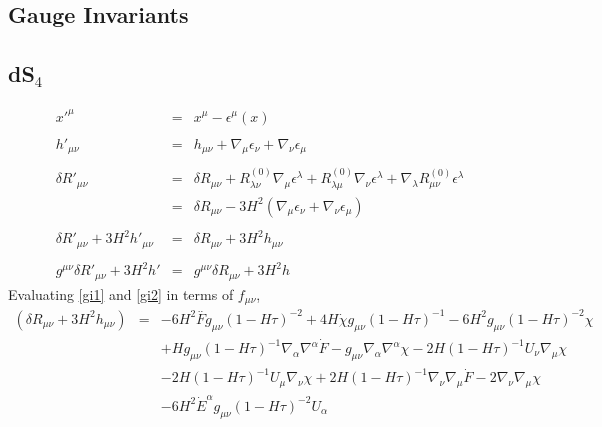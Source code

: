 \documentclass[10pt,letterpaper]{article}
\numberwithin{equation}{section}
\begin{document}
\begin{appendices}
\newpage
%
%
\section{Gauge Invariants}
%
\subsection{dS$_{4}$}
%
\begin{eqnarray}
x'^\mu &=& x^\mu - \epsilon^\mu(x)
\\ \nonumber\\
h'_{\mu\nu} &=&  h_{\mu\nu} + \nabla_\mu\epsilon_\nu + \nabla_\nu \epsilon_\mu 
\\ \nonumber\\
\delta R'_{\mu\nu} &=& \delta R_{\mu\nu} + R^{(0)}_{\lambda\nu} \nabla_\mu \epsilon^\lambda + R^{(0)}_{\lambda\mu} \nabla_\nu \epsilon^\lambda + \nabla_\lambda R^{(0)}_{\mu\nu} \epsilon^\lambda
\nonumber\\
&=& \delta R_{\mu\nu} -3H^2 ( \nabla_\mu \epsilon_\nu + \nabla_\nu \epsilon_\mu )
\\ \nonumber\\
\delta R'_{\mu\nu} + 3H^2 h'_{\mu\nu} &=& \delta R_{\mu\nu} + 3H^2 h_{\mu\nu}
\label{gi1}
\\ \nonumber\\
g^{\mu\nu} \delta R'_{\mu\nu} + 3H^2 h' &=& g^{\mu\nu} \delta R_{\mu\nu} + 3H^2 h
\label{gi2}
\end{eqnarray}
Evaluating \eqref{gi1} and \eqref{gi2} in terms of $f_{\mu\nu}$, 
\begin{eqnarray}
(\delta R_{\mu\nu} + 3H^2 h_{\mu\nu}) &=&
-6 H^2 \overset{..}{F} g_{\mu \nu } (1 -  H \tau)^{-2}
+ 4 H \dot{\chi} g_{\mu \nu } (1 -  H \tau)^{-1}
- 6 H^2 g_{\mu \nu } (1 -  H \tau)^{-2} \chi\nonumber\\
&& + H g_{\mu \nu } (1 -  H \tau)^{-1} \nabla_{\alpha }\nabla^{\alpha }\dot{F}
-  g_{\mu \nu } \nabla_{\alpha }\nabla^{\alpha }\chi
- 2 H (1 -  H \tau)^{-1} U_{\nu } \nabla_{\mu }\chi\nonumber\\
&& - 2 H (1 -  H \tau)^{-1} U_{\mu } \nabla_{\nu }\chi
+ 2 H (1 -  H \tau)^{-1} \nabla_{\nu }\nabla_{\mu }\dot{F}
- 2 \nabla_{\nu }\nabla_{\mu }\chi
\nonumber\\
&&
-6 H^2 \dot{E}^{\alpha } g_{\mu \nu } (1 -  H \tau)^{-2} U_{\alpha }

\end{eqnarray}
\end{appendices}
\end{document}

